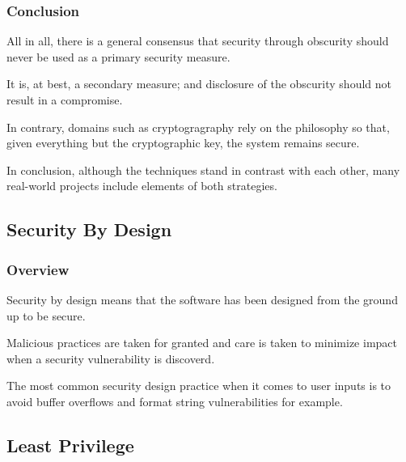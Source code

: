 
\begin{frame}
  \frametitle{Conclusion}

  All in all, there is a general consensus that security through obscurity
  should never be used as a primary security measure.

  \-

  It is, at best, a secondary measure; and disclosure of the obscurity should
  not result in a compromise.

  \-

  In contrary, domains such as cryptogragraphy rely on the
   philosophy so that, given everything but the
  cryptographic key, the system remains secure.

  \-

  In conclusion, although the techniques stand in contrast with each other,
  many real-world projects include elements of both strategies.
\end{frame}


\subsection{Security By Design}


\begin{frame}
  \frametitle{Overview}

  Security by design means that the software has been designed from the ground
  up to be secure.

  \-

  Malicious practices are taken for granted and care is taken to minimize
  impact when a security vulnerability is discoverd.

  \-

  The most common security design practice when it comes to user inputs is
  to avoid buffer overflows and format string vulnerabilities for example.
\end{frame}


\subsection{Least Privilege}


